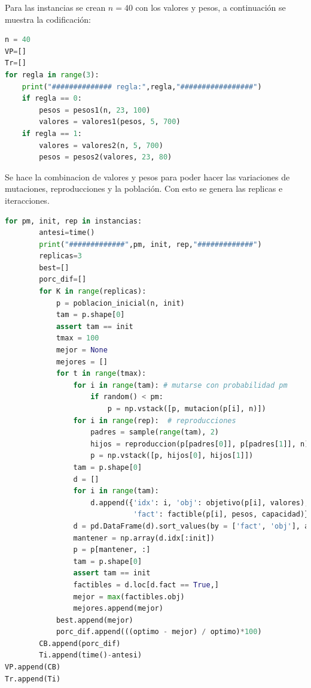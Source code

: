 \documentclass{article}
\begin{document}
Para las instancias se crean $n = 40$ con los valores y pesos, a continuación se muestra la codificación:
\begin{lstlisting}[caption=Parámetro de $n$, label=codigo2, language=Python]
n = 40
VP=[]
Tr=[]
for regla in range(3):
    print("############## regla:",regla,"#################")
    if regla == 0:
        pesos = pesos1(n, 23, 100)
        valores = valores1(pesos, 5, 700)
    if regla == 1:
        valores = valores2(n, 5, 700)
        pesos = pesos2(valores, 23, 80)
\end{lstlisting}

Se hace la combinacion de valores y pesos para poder hacer las variaciones de mutaciones, reproducciones y la población. Con esto se genera las replicas e iteracciones.

\begin{lstlisting}[caption=Generacion de funciones, label=codigo2, language=Python]
for pm, init, rep in instancias:
        antesi=time()
        print("#############",pm, init, rep,"#############")
        replicas=3
        best=[]
        porc_dif=[]
        for K in range(replicas):
            p = poblacion_inicial(n, init)
            tam = p.shape[0]
            assert tam == init
            tmax = 100
            mejor = None
            mejores = []
            for t in range(tmax):
                for i in range(tam): # mutarse con probabilidad pm
                    if random() < pm:
                        p = np.vstack([p, mutacion(p[i], n)])
                for i in range(rep):  # reproducciones
                    padres = sample(range(tam), 2)
                    hijos = reproduccion(p[padres[0]], p[padres[1]], n)
                    p = np.vstack([p, hijos[0], hijos[1]])
                tam = p.shape[0]
                d = []
                for i in range(tam):
                    d.append({'idx': i, 'obj': objetivo(p[i], valores),
                              'fact': factible(p[i], pesos, capacidad)})
                d = pd.DataFrame(d).sort_values(by = ['fact', 'obj'], ascending = False)
                mantener = np.array(d.idx[:init])
                p = p[mantener, :]
                tam = p.shape[0]
                assert tam == init
                factibles = d.loc[d.fact == True,]
                mejor = max(factibles.obj)
                mejores.append(mejor)
            best.append(mejor)
            porc_dif.append(((optimo - mejor) / optimo)*100)
        CB.append(porc_dif)
        Ti.append(time()-antesi)
VP.append(CB)
Tr.append(Ti)
\end{lstlisting}
\end{document}

